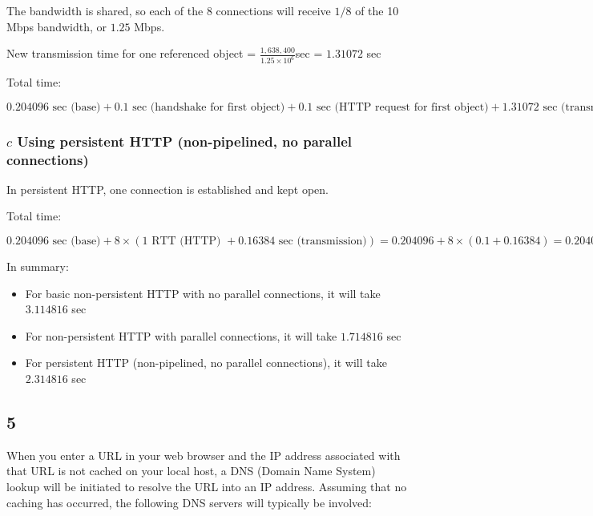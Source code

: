 \documentclass[
]{article}
\providecommand{\tightlist}{%
  \setlength{\itemsep}{0pt}\setlength{\parskip}{0pt}}
\begin{document}
The bandwidth is shared, so each of the 8 connections will receive
\(1/8\) of the 10 Mbps bandwidth, or \(1.25\) Mbps.

New transmission time for one referenced object =
\(\frac{1,638,400}{1.25 \times 10^6}\)sec = \(1.31072\) sec

Total time:

\[
0.204096 \text{ sec (base)} + 0.1 \text{ sec (handshake for first object)} + 0.1 \text{ sec (HTTP request for first object)} + 1.31072 \text{ sec (transmission for one object)}= 0.204096 + 0.1 + 0.1 + 1.31072 = 1.714816 \text{ sec}
\]

\hypertarget{c-using-persistent-http-non-pipelined-no-parallel-connections}{%
\subsubsection{\texorpdfstring{\(c\) Using persistent HTTP
(non-pipelined, no parallel
connections)}{c Using persistent HTTP (non-pipelined, no parallel connections)}}\label{c-using-persistent-http-non-pipelined-no-parallel-connections}}

In persistent HTTP, one connection is established and kept open.

Total time:

\[
0.204096 \text{ sec (base)} + 8 \times (1 \text{ RTT (HTTP) } + 0.16384 \text{ sec (transmission)})= 0.204096 + 8 \times (0.1 + 0.16384) = 0.204096 + 8 \times 0.26384 = 0.204096 + 2.11072 = 2.314816 \text{ sec}
\]

In summary:

\begin{itemize}
\tightlist
\item
  For basic non-persistent HTTP with no parallel connections, it will
  take \(3.114816\) sec
\item
  For non-persistent HTTP with parallel connections, it will take
  \(1.714816\) sec
\item
  For persistent HTTP (non-pipelined, no parallel connections), it will
  take \(2.314816\) sec
\end{itemize}

\hypertarget{section-4}{%
\subsection{5}\label{section-4}}

When you enter a URL in your web browser and the IP address associated
with that URL is not cached on your local host, a DNS (Domain Name
System) lookup will be initiated to resolve the URL into an IP address.
Assuming that no caching has occurred, the following DNS servers will
typically be involved:
\end{document}

